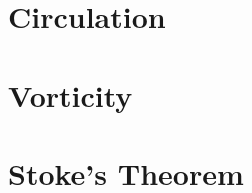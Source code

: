 \documentclass[10pt]{book}
\begin{document}
\setlength{\parskip}{0.6em}
\setlength{\parindent}{0cm}









\chapter{Circulation}



\chapter{Vorticity}



\chapter{Stoke's Theorem}














\newpage

\begin{thebibliography}{50}

\end{thebibliography}
\end{document}
